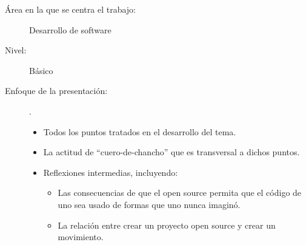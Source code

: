 \begin{description}
 \item[Área en la que se centra el trabajo:] Desarrollo de software
 \item[Nivel:] Básico
 \item[Enfoque de la presentación:] .\\
  \begin{itemize}
   \item Todos los puntos tratados en el desarrollo del tema.
   \item La actitud de ``cuero-de-chancho'' que es transversal a dichos puntos.
   \item Reflexiones intermedias, incluyendo:
     \begin{itemize}
     \item Las consecuencias de que el open source permita que el código de uno
       sea usado de formas que uno nunca imaginó.
     \item La relación entre crear un proyecto open source y crear un movimiento.
     \end{itemize}
  \end{itemize}
\end{description}
